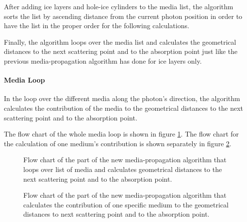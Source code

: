 After adding ice layers and hole-ice cylinders to the media list, the algorithm sorts the list by ascending distance from the current photon position in order to have the list in the proper order for the following calculations.

Finally, the algorithm loops over the media list and calculates the geometrical distances to the next scattering point and to the absorption point just like the previous media-propagation algorithm has done for ice layers only.


\paragraph{Media Loop}
In the loop over the different media along the photon's direction, the algorithm calculates the contribution of the media to the geometrical distances to the next scattering point and to the absorption point.

The flow chart of the whole media loop is shown in figure \ref{fig:nimuriX4}. The flow chart for the calculation of one medium's contribution is shown separately in figure \ref{fig:eewoo3Be}.

\begin{figure}[p]
  \resizebox{\textwidth}{!}{%
    
  }
  \vspace*{5mm}
  \caption{Flow chart of the part of the new media-propagation algorithm that loops over list of media and calculates geometrical distances to the next scattering point and to the absorption point.}
  \label{fig:nimuriX4}
\end{figure}


\begin{figure}[htbp]
  \caption{Flow chart of the part of the new media-propagation algorithm that calculates the contribution of one specific medium to the geometrical distances to next scattering point and to the absorption point.}
  \label{fig:eewoo3Be}
\end{figure}

